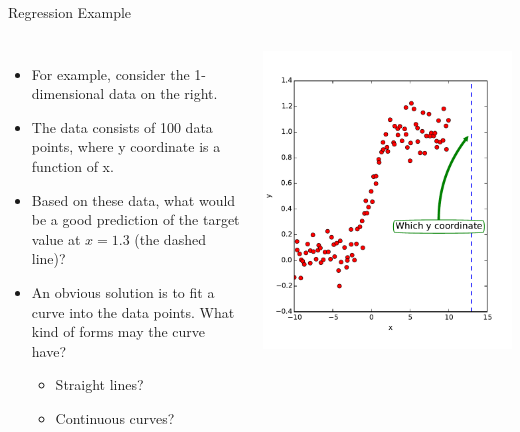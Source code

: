 \documentclass[10pt, aspectratio=169]{beamer} %
\begin{document}
\begin{frame}{Regression Example}
\begin{columns}
\begin{itemize}
\item For example, consider the 1-dimensional data on the right.
\item The data consists of 100 data points, where y coordinate is a function of x.
\item Based on these data, what would be a good prediction of the target value at $x = 1.3$
(the dashed line)?
\item An obvious solution is to fit a curve into the data points.
What kind of forms may the curve have?
\begin{itemize}
\item Straight lines?
\item Continuous curves?
\end{itemize}
\end{itemize}
\centerline{\includegraphics[width=1.2\columnwidth]{regressionExample.pdf}}
\end{columns}
\end{frame}
\end{document}
